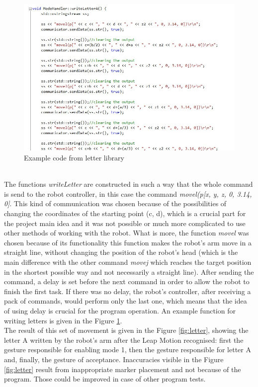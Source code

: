 \begin{figure}[H]
	\includegraphics[scale=0.8]{Aletter}
	\centering
	\caption{Example code from letter library}
	\label{fig:Aletter}
\end{figure}

\mbox{}\\
The functions \textit{writeLetter} are constructed in such a way that the whole command is send to the robot controller, in this case the command \textit{movel(p[x, y, z, 0, 3.14, 0]}. This kind of communication was chosen because of the possibilities of changing the coordinates of the starting point (c, d), which is a crucial part for the project main idea and it was not possible or much more complicated to use other methods of working with the robot. What is more, the function \textit{movel} was chosen because of its functionality \textemdash this function makes the robot's arm move in a straight line, without changing the position of the robot’s head (which is the main difference with the other command \textit{movej} which reaches the target position in the shortest possible way and not necessarily a straight line). After sending the command, a delay is set before the next command in order to allow the robot to finish the first task. If there was no delay, the robot’s controller, after receiving a pack of commands, would perform only the last one, which means that the idea of using delay is crucial for the program operation. An example function for writing letters is given in the Figure \ref{fig:Aletter}. \\


The result of this set of movement is given in the Figure \ref{fig:letter}, showing the letter A written by the robot’s arm after the Leap Motion recognised: first the gesture responsible for enabling mode 1, then the gesture responsible for letter A and, finally, the gesture of acceptance. Inaccuracies visible in the Figure \ref{fig:letter} result from inappropriate marker placement and not because of the program. Those could be improved in case of other program tests. \\

